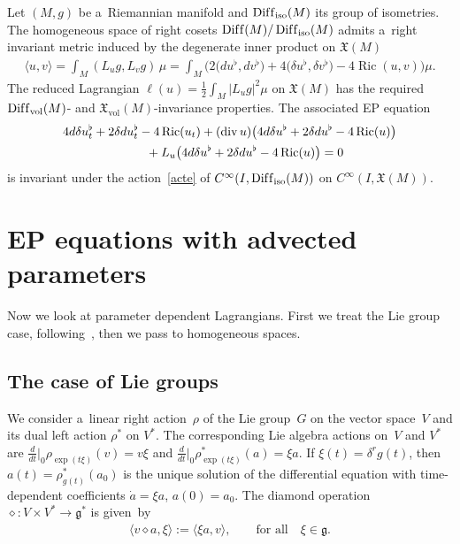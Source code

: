 \documentclass[pdftex]{sigma}
\numberwithin{equation}{section}
\begin{document}
\begin{Example}
\label{RM}
Let $(M,g)$ be a~Riemannian manifold and $\operatorname{Dif\/f}_{\operatorname{iso}}(M)$ its group of isometries.
The homogeneous space of right cosets $\operatorname{Dif\/f}(M)/\operatorname{Dif\/f}_{\operatorname{iso}}(M)$ admits
a~right invariant metric induced by the degenerate inner product on $\mathfrak X(M)$
\begin{gather*}
\langle u,v\rangle=\int_M(L_ug,L_vg)\,\mu
=\int_M \big(2\big(du^\flat,dv^\flat\big)+4\big(\delta u^\flat,\delta v^\flat\big)-4\operatorname{Ric}(u,v)\big)\mu.
\end{gather*}
The reduced Lagrangian $\ell(u)=\frac12\int_M|L_ug|^2\mu$ on $\mathfrak X(M)$ has the required
$\operatorname{Dif\/f}_{\operatorname{vol}}(M)$- and \linebreak $\mathfrak X_{\operatorname{vol}}(M)$-invariance properties.
The associated EP equation
\begin{gather*}
4d\delta u^\flat_t+2\delta du^\flat_t-4\operatorname{Ric}(u_t)  +(\operatorname{div} u)
\big(4d\delta u^\flat+2\delta du^\flat-4\operatorname{Ric}(u)\big)
\\
\hphantom{4d\delta u^\flat_t}
{}+L_u\big(4d\delta u^\flat+2\delta du^\flat-4\operatorname{Ric}(u)\big)=0
\end{gather*}
is invariant under the action~\eqref{acte} of $C^{\infty}(I,\operatorname{Dif\/f}_{\operatorname{iso}}(M))$ on
$C^{\infty}(I,\mathfrak X(M))$.
\end{Example}

\section{EP equations with advected parameters}
\label{s3}

Now we look at parameter dependent Lagrangians.
First we treat the Lie group case, follo\-wing~\cite{CHMR}, then we pass to homogeneous spaces.

\subsection{The case of Lie groups}

We consider a~linear right action~$\rho$ of the Lie group~$G$ on the vector space~$V$ and its dual left action $\rho^*$
on $V^*$.
The corresponding Lie algebra actions on~$V$ and $V^*$ are $\tfrac{d}{dt}\big|_0\rho_{\exp(t\xi)}(v)=v\xi$ and
$\tfrac{d}{dt}\big|_0\rho^*_{\exp(t\xi)}(a)=\xi a$.
If $\xi(t)=\delta^rg(t)$, then $a(t)=\rho^*_{g(t)}(a_0)$ is the unique solution of the dif\/ferential equation with
time-dependent coef\/f\/icients $\dot{a}=\xi a$, $a(0)=a_0$.
The diamond operation $\diamond:V\times V^*\to\mathfrak g^*$ is given~by
\begin{gather}
\label{dia}
\langle v\diamond a,\xi\rangle:=\langle \xi a,v\rangle,
\qquad
\text{for all}
\quad
\xi\in\mathfrak g.
\end{gather}
\end{document}
